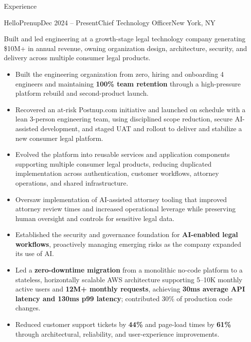 \documentclass{resume} %
\begin{document}
\begin{rSection}{Experience}


\begin{rSubsection}{HelloPrenup}{Dec 2024 -- Present}{Chief Technology Officer}{New York, NY}

Built and led engineering at a growth-stage legal technology company generating \$10M+ in annual revenue, owning organization design, architecture, security, and delivery across multiple consumer legal products.

\begin{itemize}
  \item Built the engineering organization from zero, hiring and onboarding 4 engineers and maintaining \textbf{100\% team retention} through a high-pressure platform rebuild and second-product launch.
  \item Recovered an at-risk Postnup.com initiative and launched on schedule with a lean 3-person engineering team, using disciplined scope reduction, secure AI-assisted development, and staged UAT and rollout to deliver and stabilize a new consumer legal platform.
  \item Evolved the platform into reusable services and application components supporting multiple consumer legal products, reducing duplicated implementation across authentication, customer workflows, attorney operations, and shared infrastructure.
  \item Oversaw implementation of AI-assisted attorney tooling that improved attorney review times and increased operational leverage while preserving human oversight and controls for sensitive legal data.
  \item Established the security and governance foundation for \textbf{AI-enabled legal workflows}, proactively managing emerging risks as the company expanded its use of AI.
  \item Led a \textbf{zero-downtime migration} from a monolithic no-code platform to a stateless, horizontally scalable AWS architecture supporting 5--10K monthly active users and \textbf{12M+ monthly requests}, achieving \textbf{30ms average API latency and 130ms p99 latency}; contributed 30\% of production code changes.
  \item Reduced customer support tickets by \textbf{44\%} and page-load times by \textbf{61\%} through architectural, reliability, and user-experience improvements.
\end{itemize}


\end{rSubsection}
\end{rSection}
\end{document}
